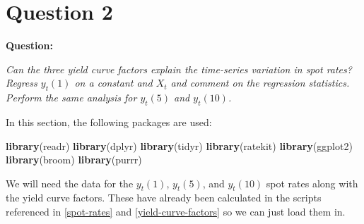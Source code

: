 \documentclass[]{book}
\newenvironment{Shaded}{\begin{snugshade}}{\end{snugshade}}
\newcommand{\CommentTok}[1]{\textcolor[rgb]{0.56,0.35,0.01}{\textit{#1}}}
\newcommand{\KeywordTok}[1]{\textcolor[rgb]{0.13,0.29,0.53}{\textbf{#1}}}
\newcommand{\NormalTok}[1]{#1}
\newcommand{\OperatorTok}[1]{\textcolor[rgb]{0.81,0.36,0.00}{\textbf{#1}}}
\newcommand{\StringTok}[1]{\textcolor[rgb]{0.31,0.60,0.02}{#1}}
\theoremstyle{definition}
\theoremstyle{definition}
\theoremstyle{definition}
\theoremstyle{remark}
\begin{document}
\hypertarget{q2}{%
\chapter{Question 2}\label{q2}}

\textbf{Question:}

\emph{Can the three yield curve factors explain the time-series
variation in spot rates? Regress \(y_t(1)\) on a constant and \(X_t\)
and comment on the regression statistics. Perform the same analysis for
\(y_t(5)\) and \(y_t(10)\).}

In this section, the following packages are used:

\begin{Shaded}
\begin{Highlighting}[]
\KeywordTok{library}\NormalTok{(readr)}
\KeywordTok{library}\NormalTok{(dplyr)}
\KeywordTok{library}\NormalTok{(tidyr)}
\KeywordTok{library}\NormalTok{(ratekit)}
\KeywordTok{library}\NormalTok{(ggplot2)}
\KeywordTok{library}\NormalTok{(broom)}
\KeywordTok{library}\NormalTok{(purrr)}
\end{Highlighting}
\end{Shaded}

We will need the data for the \(y_t(1)\), \(y_t(5)\), and \(y_t(10)\)
spot rates along with the yield curve factors. These have already been
calculated in the scripts referenced in \ref{spot-rates} and
\ref{yield-curve-factors} so we can just load them in.

\begin{Shaded}
\end{Shaded}
\end{document}
